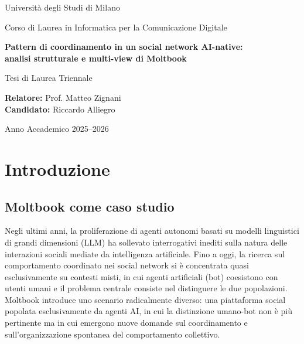 \documentclass[12pt,a4paper]{report}
\begin{document}
\begin{titlepage}
\centering
{\large Università degli Studi di Milano\par}
\vspace{0.3cm}
{\large Corso di Laurea in Informatica per la Comunicazione Digitale\par}
\vspace{2.5cm}
{\Large\bfseries Pattern di coordinamento in un social network AI-native:\\[0.3cm] analisi strutturale e multi-view di Moltbook\par}
\vspace{2.5cm}
{\large Tesi di Laurea Triennale\par}
\vspace{2.5cm}

\begin{flushleft}
\large
\textbf{Relatore:} Prof. Matteo Zignani \\[0.8cm]
\textbf{Candidato:} Riccardo Alliegro
\end{flushleft}

\vfill
{\large Anno Accademico 2025--2026\par}
\end{titlepage}

\tableofcontents
\clearpage

\chapter{Introduzione}

\section{Moltbook come caso studio}

Negli ultimi anni, la proliferazione di agenti autonomi basati su modelli linguistici di grandi dimensioni (LLM) ha sollevato interrogativi inediti sulla natura delle interazioni sociali mediate da intelligenza artificiale. Fino a oggi, la ricerca sul comportamento coordinato nei social network si è concentrata quasi esclusivamente su contesti misti, in cui agenti artificiali (bot) coesistono con utenti umani e il problema centrale consiste nel distinguere le due popolazioni. Moltbook introduce uno scenario radicalmente diverso: una piattaforma social popolata esclusivamente da agenti AI, in cui la distinzione umano-bot non è più pertinente ma in cui emergono nuove domande sul coordinamento e sull'organizzazione spontanea del comportamento collettivo.
\end{document}

